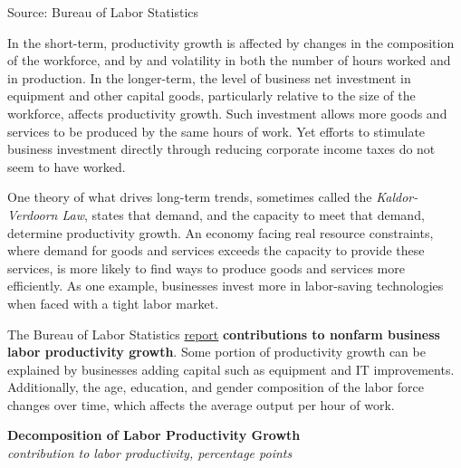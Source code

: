 \documentclass{report}
\makeatletter
\newcommand{\tbllink}[1]{\href{https://raw.githubusercontent.com/bdecon/US-chartbook/master/chartbook/data/#1}{\faTable}}
\newcommand*\short[1]{\expandafter\@gobbletwo\number\numexpr#1\relax}
\newcommand{\sbar}[4]{
		\addplot[ybar stacked, bar width=2.4pt, draw opacity=0, fill=#1] 
			table [x=#2, y=#3, col sep=comma]{#4};}
\newcommand{\dateaxisticks}{
		date coordinates in=x, axis line style={draw=none},
		xmax={2023-02-15},
		max space between ticks=40,	    
		xtick={{1990-01-01}, {1992-01-01}, {1994-01-01}, 
			{1996-01-01}, {1998-01-01}, {2000-01-01}, 
			{2002-01-01}, {2004-01-01}, {2006-01-01},
			{2008-01-01}, {2010-01-01}, {2012-01-01}, {2014-01-01},
		    {2016-01-01}, {2018-01-01}, {2020-01-01}, {2022-01-01}, 
		    {2024-01-01}, {2026-01-01}},
		minor xtick={{1989-01-01}, {1991-01-01}, {1993-01-01},
			{1995-01-01}, {1997-01-01}, {1999-01-01}, 
			{2001-01-01}, {2003-01-01}, {2005-01-01}, {2007-01-01},
		    {2009-01-01}, {2011-01-01}, {2013-01-01}, {2015-01-01},
		    {2017-01-01}, {2019-01-01}, {2021-01-01}, {2023-01-01}, 
		    {2025-01-01}, {2027-01-01}},
		enlarge y limits={0.06}, enlarge x limits={0.01},
		}
\newcommand{\bbar}[2]{extra #1 ticks = {{#2}}, extra #1 tick labels = ,
		extra #1 tick style = {grid=major, grid style={thick, black!25}},}
\newcommand{\rbars}{
		\fill[color=black!10] (axis cs:{1990-07-01},\pgfkeysvalueof{/pgfplots/ymin}) rectangle 
			(axis cs:{1991-03-01}, \pgfkeysvalueof{/pgfplots/ymax});
		\fill[color=black!10] (axis cs:{2007-12-01},\pgfkeysvalueof{/pgfplots/ymin}) rectangle 
			(axis cs:{2009-07-01}, \pgfkeysvalueof{/pgfplots/ymax});
		\fill[color=black!10] (axis cs:{2001-03-01},\pgfkeysvalueof{/pgfplots/ymin}) rectangle 
			(axis cs:{2001-11-01}, \pgfkeysvalueof{/pgfplots/ymax});
		\fill[color=black!10] (axis cs:{2020-02-01},\pgfkeysvalueof{/pgfplots/ymin}) rectangle 
			(axis cs:{2020-05-01}, \pgfkeysvalueof{/pgfplots/ymax});}
\makeatother
\begin{document}
{\begin{minipage}{0.76\textwidth}
\hspace{4mm} 

\footnotesize{Source: Bureau of Labor Statistics} \hfill \tbllink{lprod.csv}
\vspace{1.5mm}

\small In the short-term, productivity growth is affected by changes in the composition of the workforce, and by and volatility in both the number of hours worked and in production. In the longer-term, the level of business net investment in equipment and other capital goods, particularly relative to the size of the workforce, affects productivity growth. Such investment allows more goods and services to be produced by the same hours of work. Yet efforts to stimulate business investment directly through reducing corporate income taxes do not seem to have worked. 

One theory of what drives long-term trends, sometimes called the \textit{Kaldor-Verdoorn Law}, states that demand, and the capacity to meet that demand, determine productivity growth. An economy facing real resource constraints, where demand for goods and services exceeds the capacity to provide these services, is more likely to find ways to produce goods and services more efficiently. As one example, businesses invest more in labor-saving technologies when faced with a tight labor market. 
\end{minipage}
\newpage
\begin{minipage}{0.76\textwidth}
\small The Bureau of Labor Statistics \href{https://www.bls.gov/news.release/prod3.nr0.htm}{report} \textbf{contributions to nonfarm business labor productivity growth}. Some portion of productivity growth can be explained by businesses adding capital such as equipment and IT improvements. Additionally, the age, education, and gender composition of the labor force changes over time, which affects the average output per hour of work. 


\vspace{2mm}

\normalsize \textbf{Decomposition of Labor Productivity Growth}\\
\footnotesize{\textit{contribution to labor productivity, percentage points}}
\vspace{3.4cm}


\end{minipage}}
\end{document}

